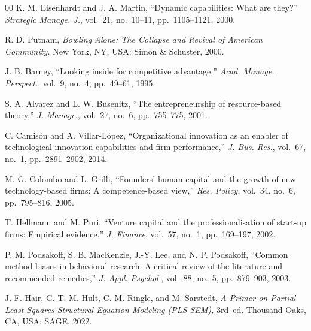 \documentclass{ieeeaccess}
\begin{document}
\begin{thebibliography}{00}
 K. M. Eisenhardt and J. A. Martin, ``Dynamic capabilities:
What are they?'' \emph{Strategic Manage. J.}, vol.~21, no.~10--11,
pp.~1105--1121, 2000.

 R. D. Putnam, \emph{Bowling Alone: The Collapse and Revival
of American Community.} New York, NY, USA: Simon \& Schuster, 2000.

 J. B. Barney, ``Looking inside for competitive advantage,''
\emph{Acad. Manage. Perspect.}, vol.~9, no.~4, pp.~49--61, 1995.

 S. A. Alvarez and L. W. Busenitz, ``The entrepreneurship of
resource-based theory,'' \emph{J. Manage.}, vol.~27, no.~6,
pp.~755--775, 2001.

 C. Camisón and A. Villar-López, ``Organizational innovation
as an enabler of technological innovation capabilities and firm
performance,'' \emph{J. Bus. Res.}, vol.~67, no.~1, pp.~2891--2902,
2014.

 M. G. Colombo and L. Grilli, ``Founders' human capital and
the growth of new technology-based firms: A competence-based view,''
\emph{Res. Policy}, vol.~34, no.~6, pp.~795--816, 2005.

 T. Hellmann and M. Puri, ``Venture capital and the
professionalisation of start-up firms: Empirical evidence,''
\emph{J. Finance}, vol.~57, no.~1, pp.~169--197, 2002.

 P. M. Podsakoff, S. B. MacKenzie, J.-Y. Lee, and
N. P. Podsakoff, ``Common method biases in behavioral research: A
critical review of the literature and recommended remedies,''
\emph{J. Appl. Psychol.}, vol.~88, no.~5, pp.~879--903, 2003.

 J. F. Hair, G. T. M. Hult, C. M. Ringle, and
M. Sarstedt, \emph{A Primer on Partial Least Squares Structural Equation
Modeling (PLS-SEM),} 3rd~ed. Thousand Oaks, CA, USA: SAGE, 2022.

\end{thebibliography}

\EOD
\end{document}

